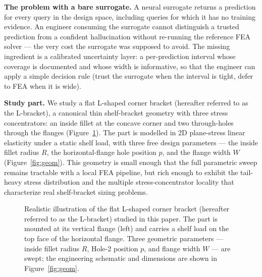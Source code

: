 \documentclass[11pt]{article}
\begin{document}
\textbf{The problem with a bare surrogate.} A neural surrogate returns a
prediction for every query in the design space, including queries for which
it has no training evidence. An engineer consuming the surrogate cannot
distinguish a trusted prediction from a confident hallucination without
re-running the reference FEA solver --- the very cost the surrogate was
supposed to avoid. The missing ingredient is a calibrated
uncertainty layer: a per-prediction interval whose coverage is documented
and whose width is informative, so that the engineer can apply a simple
decision rule (trust the surrogate when the interval is tight, defer to
FEA when it is wide).

\textbf{Study part.} We study a flat L-shaped corner bracket (hereafter
referred to as the L-bracket), a canonical thin shelf-bracket geometry
with three stress concentrators: an inside fillet at the concave corner
and two through-holes through the flanges (Figure~\ref{fig:bracket_photo}).
The part is modelled in 2D plane-stress linear elasticity under a static
shelf load, with three free design parameters --- the inside fillet radius
$R$, the horizontal-flange hole position $p$, and the flange width $W$
(Figure~\ref{fig:geom}). This geometry is small enough that the full
parametric sweep remains tractable with a local FEA pipeline, but rich
enough to exhibit the tail-heavy stress distribution and the multiple
stress-concentrator locality that characterize real shelf-bracket sizing
problems.

\begin{figure}[t]
  \centering
  \caption{Realistic illustration of the flat L-shaped corner bracket
    (hereafter referred to as the L-bracket) studied in this paper.
    The part is mounted at its vertical flange (left) and carries a shelf
    load on the top face of the horizontal flange. Three geometric
    parameters --- inside fillet radius $R$, Hole-2 position $p$, and
    flange width $W$ --- are swept; the engineering schematic and
    dimensions are shown in Figure~\ref{fig:geom}.}
  \label{fig:bracket_photo}
\end{figure}
\end{document}
